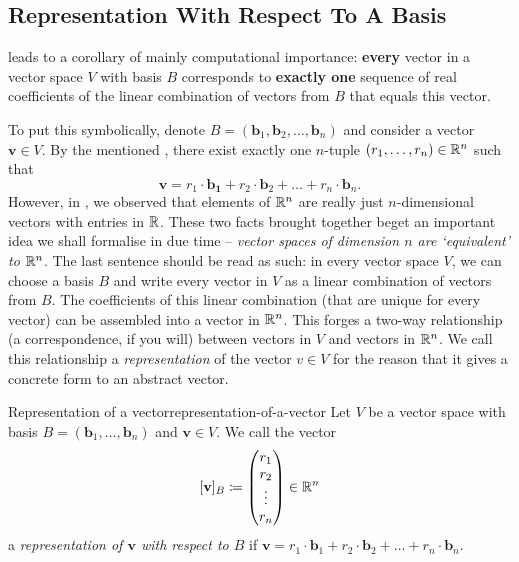 \subsection{Representation With Respect To A Basis}
\label{ssec:representation-with-respect-to-a-basis}

 leads to a corollary of mainly
computational importance: \textbf{every} vector in a vector space $V$ with basis
$B$ corresponds to \textbf{exactly one} sequence of real coefficients of the
linear combination of vectors from $B$ that equals this vector.

To put this symbolically, denote $B =
(\mathbf{b}_1,\mathbf{b}_2,\ldots,\mathbf{b}_n)$ and consider a vector
$\mathbf{v} \in V$. By the mentioned
, there exist exactly one
$n$-tuple $(r_1,\ldots,r_n) \in \mathbb{R}^{n}$ such that
\[
 \mathbf{v} = r_1 \cdot \mathbf{b_1} + r_2 \cdot \mathbf{b}_2 + \ldots + r_n
 \cdot \mathbf{b}_n.
\]
However, in , we observed that elements of
$\mathbb{R}^{n}$ are really just $n$-dimensional vectors with entries in $\mathbb{R}$. These two
facts brought together beget an important idea we shall formalise in due time --
\emph{vector spaces of dimension $n$ are `equivalent' to $\mathbb{R}^{n}$}. The last
sentence should be read as such: in every vector space $V$, we can choose a
basis $B$ and write every vector in $V$ as a linear combination of vectors from
$B$. The coefficients of this linear combination (that are unique for every
vector) can be assembled into a vector in $\mathbb{R}^{n}$. This forges a two-way
relationship (a correspondence, if you will) between vectors in $V$ and vectors
in $\mathbb{R}^{n}$. We call this relationship a \emph{representation} of the vector
$v \in V$ for the reason that it gives a concrete form to an abstract vector.

\begin{definition}{Representation of a vector}{representation-of-a-vector}
 Let $V$ be a vector space with basis $B = (\mathbf{b}_1,\ldots,\mathbf{b}_n)$
 and $\mathbf{v} \in V$. We call the vector
 \[
  [\mathbf{v}]_B \coloneqq
  \begin{pmatrix}
   r_1\\
   r_2\\
   \vdots\\
   r_n
  \end{pmatrix}
 \in \mathbb{R}^{n}
 \]
 a \emph{representation of $\mathbf{v}$ with respect to $B$} if $\mathbf{v} =
 r_1 \cdot \mathbf{b}_1 + r_2 \cdot \mathbf{b}_2 + \ldots + r_n \cdot
 \mathbf{b}_n$.
\end{definition}

